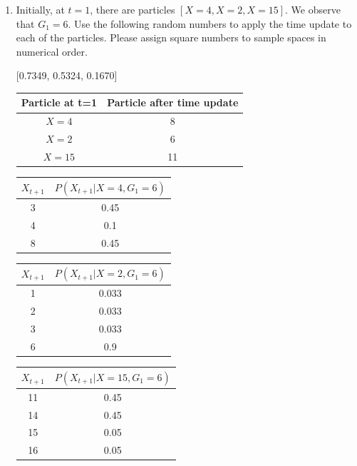 \documentclass[12pt]{article}
\begin{document}
\begin{enumerate}

\item Initially, at $t=1$, there are particles $[X=4, X=2, X=15]$. We
  observe that $G_1 = 6$. Use the following random numbers to apply
  the time update to each of the particles. Please assign square numbers
    to sample spaces in numerical order.

\vspace{-1ex}
\begin{center} [0.7349, 0.5324, 0.1670] \end{center}
  
\begin{center}
\renewcommand{\arraystretch}{2}
\begin{tabular} {|c|c|}
\hline
Particle at t=1 & Particle after time update \\ \hline
$X=4$  & 8 \\ \hline
$X=2$  & 6 \\ \hline
$X=15$ & 11 \\
\hline
\end{tabular}
\end{center}

\begin{center}
  \begin{tabular}{|c|c|}
    \hline
    $X_{t+1}$ & $P(X_{t+1}|X=4,G_1=6)$ \\
    \hline
    3 & 0.45 \\
    \hline
    4 & 0.1 \\
    \hline
    8 & 0.45 \\
    \hline
  \end{tabular}

  \begin{tabular}{|c|c|}
    \hline
    $X_{t+1}$ & $P(X_{t+1}|X=2,G_1=6)$ \\
    \hline
    1 & 0.033 \\
    \hline
    2 & 0.033 \\
    \hline
    3 & 0.033 \\
    \hline
    6 & 0.9 \\
    \hline
  \end{tabular}

  \begin{tabular}{|c|c|}
    \hline
    $X_{t+1}$ & $P(X_{t+1}|X=15,G_1=6)$ \\
    \hline
    11 & 0.45 \\
    \hline
    14 & 0.45 \\
    \hline
    15 & 0.05 \\
    \hline
    16 & 0.05 \\
    \hline
  \end{tabular}
\end{center}
  

\end{enumerate}
\end{document}
